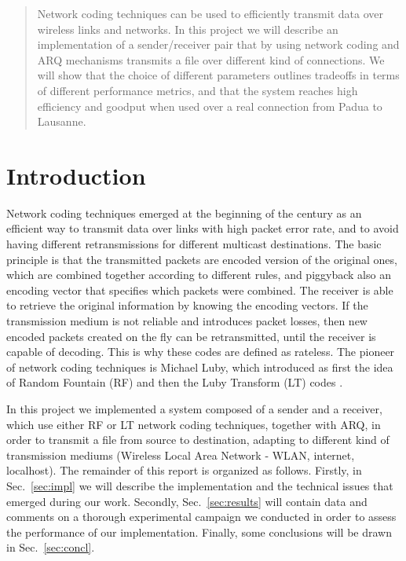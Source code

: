 \begin{abstract}
Network coding techniques can be used to efficiently transmit data over wireless links and networks. In this project we will describe an implementation of a sender/receiver pair that by using network coding and ARQ mechanisms transmits a file over different kind of connections. We will show that the choice of different parameters outlines tradeoffs in terms of different performance metrics, and that the system reaches high efficiency and goodput when used over a real connection from Padua to Lausanne.
\end{abstract}

\section{Introduction}
Network coding techniques emerged at the beginning of the century as an efficient way to transmit data over links with high packet error rate, and to avoid having different retransmissions for different multicast destinations. The basic principle is that the transmitted packets are encoded version of the original ones, which are combined together according to different rules, and piggyback also an encoding vector that specifies which packets were combined. The receiver is able to retrieve the original information by knowing the encoding vectors. If the transmission medium is not reliable and introduces packet losses, then new encoded packets created on the fly can be retransmitted, until the receiver is capable of decoding. This is why these codes are defined as rateless. The pioneer of network coding techniques is Michael Luby, which introduced as first the idea of Random Fountain (RF) \cite{rf} and then the Luby Transform (LT) codes \cite{lt}.

In this project we implemented a system composed of a sender and a receiver, which use either RF or LT network coding techniques, together with ARQ, in order to transmit a file from source to destination, adapting to different kind of transmission mediums (Wireless Local Area Network - WLAN, internet, localhost). The remainder of this report is organized as follows. Firstly, in Sec.~\ref{sec:impl} we will describe the implementation and the technical issues that emerged during our work. Secondly, Sec.~\ref{sec:results} will contain data and comments on a thorough experimental campaign we conducted in order to assess the performance of our implementation. Finally, some conclusions will be drawn in Sec.~\ref{sec:concl}.